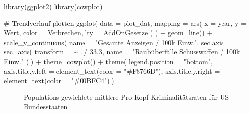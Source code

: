 \documentclass[
  a4paper,
  DIV=11,
  oneside]{scrreprt}
\newenvironment{Shaded}{\begin{snugshade}}{\end{snugshade}}
\newcommand{\AttributeTok}[1]{\textcolor[rgb]{0.40,0.45,0.13}{#1}}
\newcommand{\CommentTok}[1]{\textcolor[rgb]{0.37,0.37,0.37}{#1}}
\newcommand{\FloatTok}[1]{\textcolor[rgb]{0.68,0.00,0.00}{#1}}
\newcommand{\FunctionTok}[1]{\textcolor[rgb]{0.28,0.35,0.67}{#1}}
\newcommand{\NormalTok}[1]{\textcolor[rgb]{0.00,0.23,0.31}{#1}}
\newcommand{\SpecialCharTok}[1]{\textcolor[rgb]{0.37,0.37,0.37}{#1}}
\newcommand{\StringTok}[1]{\textcolor[rgb]{0.13,0.47,0.30}{#1}}
\begin{document}
\begin{Shaded}
\begin{Highlighting}[]
\FunctionTok{library}\NormalTok{(ggplot2)}
\FunctionTok{library}\NormalTok{(cowplot)}

\CommentTok{\# Trendverlauf plotten}
\FunctionTok{ggplot}\NormalTok{(}
  \AttributeTok{data =}\NormalTok{ plot\_dat,}
  \AttributeTok{mapping =} \FunctionTok{aes}\NormalTok{(}
    \AttributeTok{x =}\NormalTok{ year, }
    \AttributeTok{y =}\NormalTok{ Wert, }
    \AttributeTok{color =}\NormalTok{ Verbrechen, }
    \AttributeTok{lty =}\NormalTok{ AddOnGesetze}
\NormalTok{  )}
\NormalTok{) }\SpecialCharTok{+}
  \FunctionTok{geom\_line}\NormalTok{() }\SpecialCharTok{+}
  \FunctionTok{scale\_y\_continuous}\NormalTok{(}
    \AttributeTok{name =} \StringTok{"Gesamte Anzeigen / 100k Einw."}\NormalTok{,}
    \AttributeTok{sec.axis =} \FunctionTok{sec\_axis}\NormalTok{(}
      \AttributeTok{transform =} \SpecialCharTok{\textasciitilde{}}\NormalTok{ . }\SpecialCharTok{/} \FloatTok{33.3}\NormalTok{, }
      \AttributeTok{name =} \StringTok{"Raubüberfälle Schusswaffen / 100k Einw."}
\NormalTok{    )}
\NormalTok{  ) }\SpecialCharTok{+}
  \FunctionTok{theme\_cowplot}\NormalTok{() }\SpecialCharTok{+}
  \FunctionTok{theme}\NormalTok{(}
    \AttributeTok{legend.position =} \StringTok{"bottom"}\NormalTok{, }
    \AttributeTok{axis.title.y.left =} \FunctionTok{element\_text}\NormalTok{(}\AttributeTok{color =} \StringTok{"\#F8766D"}\NormalTok{),}
    \AttributeTok{axis.title.y.right =} \FunctionTok{element\_text}\NormalTok{(}\AttributeTok{color =} \StringTok{"\#00BFC4"}\NormalTok{)}
\NormalTok{  )}
\end{Highlighting}
\end{Shaded}

\begin{figure}[t]


\caption{\label{fig-abramstrends}Populations-gewichtete mittlere
Pro-Kopf-Kriminalitätsraten für US-Bundesstaaten}

\end{figure}%
\end{document}

